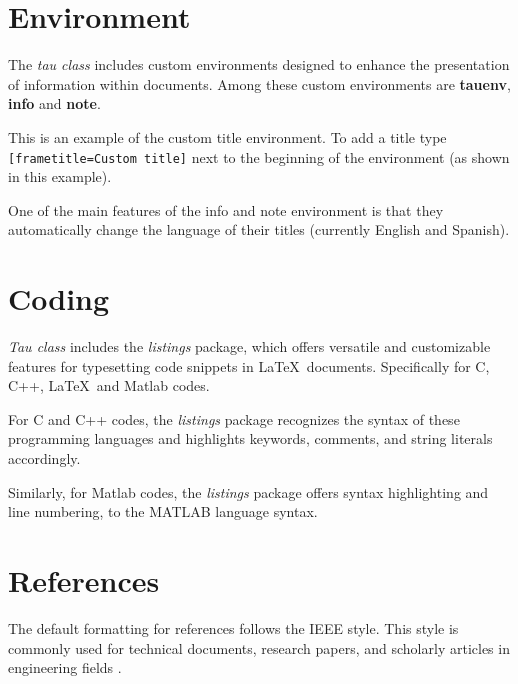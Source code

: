 \documentclass[9pt,a4paper,twoside]{tau}
\begin{document}
\section{Environment}

    The \textit{tau class} includes custom environments designed to enhance the presentation of information within documents. Among these custom environments are \textbf{tauenv}, \textbf{info} and \textbf{note}.

    \begin{tauenv}[frametitle=Custom title]
        This is an example of the custom title environment. To add a title type \verb|[frametitle=Custom title]| next to the beginning of the environment (as shown in this example).
    \end{tauenv}

    One of the main features of the info and note environment is that they automatically change the language of their titles (currently English and Spanish).

\section{Coding}

    \textit{Tau class} includes the \textit{listings} package, which offers versatile and customizable features for typesetting code snippets in \LaTeX\ documents. Specifically for C, C++, \LaTeX\ and Matlab codes. 

    For C and C++ codes, the \textit{listings} package recognizes the syntax of these programming languages and highlights keywords, comments, and string literals accordingly.

    

    Similarly, for Matlab codes, the \textit{listings} package offers syntax highlighting and line numbering, to the MATLAB language syntax.
    
    

\section{References}

    The default formatting for references follows the IEEE style. This style is commonly used for technical documents, research papers, and scholarly articles in engineering fields \cite{einstein}.
\end{document}
